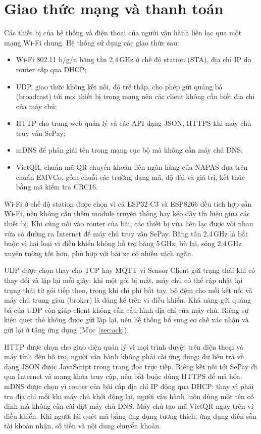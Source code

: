 \section{Giao thức mạng và thanh toán}
Các thiết bị của hệ thống và điện thoại của người vận hành liên lạc qua một mạng Wi-Fi chung. Hệ thống sử
dụng các giao thức sau:
\begin{itemize}
  \item Wi-Fi 802.11 b/g/n băng tần 2,4\,GHz ở chế độ station (STA), địa chỉ IP do router cấp qua DHCP;
  \item UDP, giao thức không kết nối, độ trễ thấp, cho phép gửi quảng bá (broadcast) tới mọi
        thiết bị trong mạng nên các client không cần biết địa chỉ của máy chủ;
  \item HTTP cho trang web quản lý và các API dạng JSON, HTTPS khi máy chủ truy vấn SePay;
  \item mDNS để phân giải tên  trong mạng cục bộ mà không cần máy chủ DNS;
  \item VietQR, chuẩn mã QR chuyển khoản liên ngân hàng của NAPAS dựa trên chuẩn EMVCo, gồm
        chuỗi các trường dạng mã, độ dài và giá trị, kết thúc bằng mã kiểm tra CRC16.
\end{itemize}

Wi-Fi ở chế độ station được chọn vì cả ESP32-C3 và ESP8266 đều tích hợp sẵn Wi-Fi, nên không
cần thêm module truyền thông hay kéo dây tín hiệu giữa các thiết bị. Khi cùng nối vào router của
bãi, các thiết bị vừa liên lạc được với nhau vừa có đường ra Internet để máy chủ truy vấn SePay.
Băng tần 2,4\,GHz là bắt buộc vì hai loại vi điều khiển không hỗ trợ băng 5\,GHz; bù lại, sóng
2,4\,GHz xuyên tường tốt hơn, phù hợp với bãi xe có nhiều vách ngăn.

UDP được chọn thay cho TCP hay MQTT vì Sensor Client gửi trạng thái khi có thay đổi và lặp lại mỗi
giây: khi một gói bị mất, máy chủ có thể cập nhật lại trạng thái từ gói tiếp theo, trong khi chi phí bắt tay, bộ đệm cho mỗi kết
nối và máy chủ trung gian (broker) là đáng kể trên vi điều khiển. Khả năng gửi quảng bá của UDP
còn giúp client không cần cấu hình địa chỉ của máy chủ. Riêng sự kiện quẹt thẻ không được gửi
lặp lại, nên hệ thống bổ sung cơ chế xác nhận và gửi lại ở tầng ứng dụng (Mục~\ref{sec:ack}).

HTTP được chọn cho giao diện quản lý vì mọi trình duyệt trên điện thoại và máy tính đều hỗ trợ,
người vận hành không phải cài ứng dụng; dữ liệu trả về dạng JSON được JavaScript trong trang
đọc trực tiếp. Riêng kết nối tới SePay đi qua Internet và mang khóa truy cập, nên bắt buộc dùng
HTTPS để mã hóa. mDNS được chọn vì router của bãi cấp địa chỉ IP động qua DHCP: thay vì phải tra
địa chỉ mỗi khi máy chủ khởi động lại, người vận hành luôn dùng một tên cố định mà không cần cài
đặt máy chủ DNS. Máy chủ tạo mã VietQR ngay trên vi điều khiển. Khi người lái quét mã bằng ứng dụng tương thích, ứng dụng điền sẵn tài khoản nhận, số tiền và nội dung chuyển khoản.

